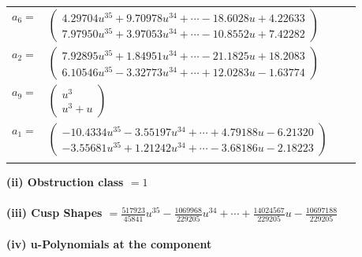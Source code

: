 \documentclass[1p]{elsarticle_modified}
\theoremstyle{definition}
\begin{document}
\begin{tabular}{m{7pt} m{180pt} m{7pt} m{180pt} }
\flushright $a_{6}=$&$\begin{pmatrix}4.29704 u^{35}+9.70978 u^{34}+\cdots-18.6028 u+4.22633\\7.97950 u^{35}+3.97053 u^{34}+\cdots-10.8552 u+7.42282\end{pmatrix}$ \\
\flushright $a_{2}=$&$\begin{pmatrix}7.92895 u^{35}+1.84951 u^{34}+\cdots-21.1825 u+18.2083\\6.10546 u^{35}-3.32773 u^{34}+\cdots+12.0283 u-1.63774\end{pmatrix}$ \\
\flushright $a_{9}=$&$\begin{pmatrix}u^3\\u^3+u\end{pmatrix}$ \\
\flushright $a_{1}=$&$\begin{pmatrix}-10.4334 u^{35}-3.55197 u^{34}+\cdots+4.79188 u-6.21320\\-3.55681 u^{35}+1.21242 u^{34}+\cdots-3.68186 u-2.18223\end{pmatrix}$\\&\end{tabular}
\flushleft \textbf{(ii) Obstruction class $= 1$}\\~\\
\flushleft \textbf{(iii) Cusp Shapes $= \frac{517923}{45841} u^{35}-\frac{1069968}{229205} u^{34}+\cdots+\frac{14024567}{229205} u-\frac{10697188}{229205}$}\\~\\
\newpage\renewcommand{\arraystretch}{1}
\flushleft \textbf{(iv) u-Polynomials at the component}\newline \\
\end{document}
